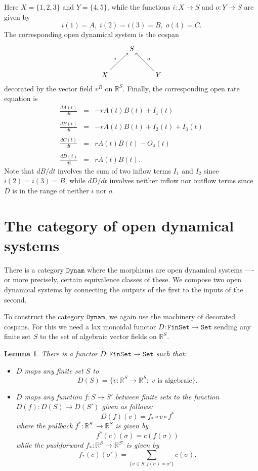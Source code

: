 \documentclass{compositionalityarticle}
\newcommand{\R}{\mathbb{R}}
\newcommand{\FinSet}{\mathtt{FinSet}}
\newcommand{\Set}{\mathtt{Set}}
\newcommand{\Dynam}{\mathtt{Dynam}}
\newcommand{\maps}{\colon}
\theoremstyle{compositionality}
\newtheorem{lem}[thm]{Lemma}
\theoremstyle{remark}
\begin{document}
Here $X = \{1,2,3\}$ and $Y = \{4,5\}$, while the functions $i \maps X \to S$ and $o \maps Y \to S$ are given by
\[      i(1) = A, \; i(2) = i(3) = B, \; o(4) = C. \]
The corresponding open dynamical system is the cospan
\[ \xymatrix{  & S  &  \\ X \ar[ur]^{i} & & Y \ar[ul]_{o} } \]
decorated by the vector field $v^R$ on $\R^S$.   Finally, the corresponding open rate equation is
\[ 
\begin{array}{rcl} 
\displaystyle{\frac{dA(t)}{dt}} &=& - r A(t) B(t)  + I_1(t)\\ \\
\displaystyle{\frac{dB(t)}{dt}} &=& - r A(t) B(t) + I_2(t) + I_3(t) \\ \\
\displaystyle{\frac{dC(t)}{dt}} &=& r A(t) B(t) - O_4(t) \\ \\
\displaystyle{\frac{dD(t)}{dt}} &=& r A(t) B(t).
\end{array}
\]
Note that $dB/dt$ involves the sum of two inflow terms $I_1$ and $I_2$ 
since $i(2) = i(3) = B$, while $dD/dt$ involves neither inflow nor outflow terms 
since $D$ is in the range of neither $i$ nor $o$.  

\section{The category of open dynamical systems}
\label{sec:opendynam}

There is a category $\Dynam$ where the morphisms are open dynamical systems ----or more precisely, certain equivalence classes of these.  We compose two open dynamical systems by connecting the outputs of the first to the inputs of the second.  

To construct the category $\Dynam$, we again use the machinery of decorated cospans.  
For this we need a lax monoidal functor $D \maps \FinSet \to \Set$ sending any finite set $S$ to the set of algebraic vector fields on $\R^S$.

\begin{lem}
\label{lemma:Dfunctor}
There is a functor $D \maps \FinSet \to \Set$ such that:
\begin{itemize}
\item $D$ maps any finite set $S$ to 
\[ D(S) = \{ v \maps \R^S \to \R^S : \; v \textrm{ is algebraic}  \}. \] 
\item $D$ maps any function $f \maps S \to S'$ between finite sets to the function $D(f) \maps D(S) \to D(S')$ given as follows:
\[ D(f)(v) = f_* \circ v \circ f^* \]
where the pullback $ f^* \maps \R^{S'} \to \R^S $ is given by
\[ f^*(c)(\sigma) = c(f(\sigma)) \] 
while the pushforward $ f_* \maps \R^{S} \to \R^{S'} $ is given by
\[ f_*(c)(\sigma') = \sum_{ \{ \sigma \in S : f(\sigma) = \sigma' \} } c(\sigma). \]
\end{itemize}
\end{lem}
\end{document}

